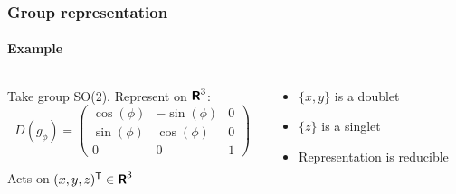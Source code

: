 \documentclass[english, fleqn]{beamer}
\begin{document}
\begin{frame}
    \frametitle{Group representation}
    \framesubtitle{Example}
    
    \begin{columns}
        \begin{column}{.6\linewidth}
            Take group SO(2). Represent on $\text{\bfseries\sffamily{R}}^3$:
            \[
                D(g_\phi) =
                \begin{pmatrix}
                    \cos(\phi) & - \sin(\phi) & 0 \\
                    \sin(\phi) & \cos(\phi) & 0 \\
                    0 & 0 & 1
                \end{pmatrix}
            \]

            Acts on $(x, y, z)^\mathsf T \in \text{\bfseries\sffamily{R}}^3$
        \end{column}
        \pause
        \begin{column}{.4\linewidth}
            \begin{itemize}
                \item $\{ x, y \}$ is a doublet
                \item $\{ z \}$ is a singlet
                \item Representation is reducible
            \end{itemize}
        \end{column}
    \end{columns}
\end{frame}
\end{document}
